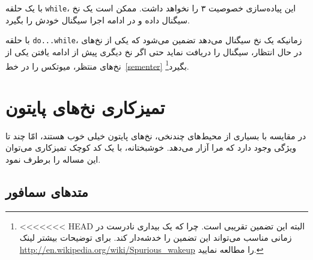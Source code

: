 \documentclass{book}
\begin{document}
    با یک حلقه {\tt while}، این پیاده‌سازی خصوصیت ۳ را نخواهد داشت. ممکن است یک نخ سیگنال داده و در ادامه اجرا سیگنال خودش 
    را بگیرد. 

    با حلقه {\tt do...while}، زمانیکه یک نخ سیگنال می‌دهد تضمین می‌شود که یکی از نخ‌های در حال انتظار، سیگنال را دریافت نماید 
    حتی اگر نخ دیگری  پیش از ادامه یافتن یکی از نخ‌های منتظر، میوتکس را در خط~\ref{sementer} بگیرد\footnote{
<<<<<<< HEAD
    البته این تضمین تقریبی است. چرا که یک بیداری نادرست در زمانی مناسب می‌تواند این تضمین را خدشه‌دار کند. برای توضیحات بیشتر لینک 
    \url{http://en.wikipedia.org/wiki/Spurious_wakeup} را مطالعه نمایید. 
    }.



\setLTRbibitems



\appendix

\chapter{تمیزکاری نخ‌های پایتون}
\label{cleanup}

    در مقایسه با  بسیاری از محیط‌های چندنخی، نخ‌های پایتون خیلی خوب هستند، امّا چند تا ویژگی وجود دارد که مرا آزار می‌دهد. 
    خوشبختانه،‌ با یک کد کوچک تمیزکاری می‌توان این مساله را برطرف نمود. 

\section{متدهای سمافور}
\end{document}
